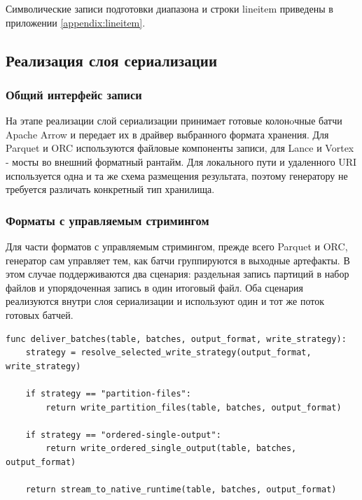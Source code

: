 \noindent Символические записи подготовки диапазона и строки
lineitem приведены в приложении \ref{appendix:lineitem}.

\renewcommand{\arraystretch}{1}

\subsection{Реализация слоя сериализации}

\subsubsection{Общий интерфейс записи}

На этапе реализации слой сериализации принимает готовые колонoчные батчи
Apache Arrow и передает их в драйвер выбранного формата хранения.
Для Parquet и ORC используются файловые компоненты записи,
для Lance и Vortex - мосты во внешний форматный рантайм.
Для локального пути и удаленного URI используется одна и та же схема
размещения результата, поэтому генератору не требуется различать конкретный
тип хранилища.

\subsubsection{Форматы с управляемым стримингом}

Для части форматов с управляемым стримингом, прежде всего Parquet и
ORC, генератор сам управляет тем, как батчи группируются в выходные
артефакты. В этом случае поддерживаются два сценария: раздельная запись
партиций в набор файлов и упорядоченная запись в один итоговый файл. Оба
сценария реализуются внутри слоя сериализации и используют один и тот же
поток готовых батчей.

\begin{lstlisting}[style=reportpseudocode,caption={Выбор режима записи},label={lst:chapter3-write-strategy}]
func deliver_batches(table, batches, output_format, write_strategy):
    strategy = resolve_selected_write_strategy(output_format, write_strategy)

    if strategy == "partition-files":
        return write_partition_files(table, batches, output_format)

    if strategy == "ordered-single-output":
        return write_ordered_single_output(table, batches, output_format)

    return stream_to_native_runtime(table, batches, output_format)
\end{lstlisting}

